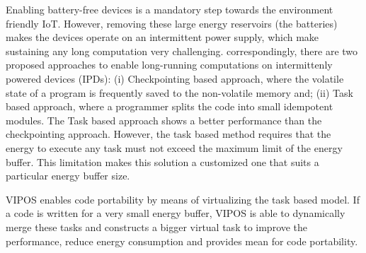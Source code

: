 Enabling battery-free devices is a mandatory step towards the environment friendly IoT. However, removing these large energy reservoirs (the batteries) makes the devices operate on an intermittent power supply, which make sustaining any long computation very challenging. correspondingly, there are two proposed approaches to enable long-running computations on intermittenly powered devices (IPDs): (i) Checkpointing based approach, where the volatile state of a program is frequently saved to the non-volatile memory and; (ii)  Task based approach, where a programmer splits the code into small idempotent modules. The Task based approach shows a better performance than the checkpointing approach. However, the task based method requires that the energy to execute any task must not exceed the maximum limit of the energy buffer. This limitation makes this solution a customized one that suits a particular energy buffer size. 

VIPOS enables code portability by means of virtualizing the task based model. If a code is written for a very small energy buffer, VIPOS is able to dynamically merge these tasks and constructs a bigger virtual task to improve the performance, reduce energy consumption and provides mean for code portability. 
